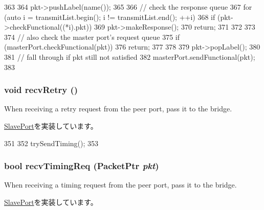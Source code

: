 \begin{DoxyCode}
363 {
364     pkt->pushLabel(name());
365 
366     // check the response queue
367     for (auto i = transmitList.begin();  i != transmitList.end(); ++i) {
368         if (pkt->checkFunctional((*i).pkt)) {
369             pkt->makeResponse();
370             return;
371         }
372     }
373 
374     // also check the master port's request queue
375     if (masterPort.checkFunctional(pkt)) {
376         return;
377     }
378 
379     pkt->popLabel();
380 
381     // fall through if pkt still not satisfied
382     masterPort.sendFunctional(pkt);
383 }
\end{DoxyCode}
\hypertarget{classBridge_1_1BridgeSlavePort_a29cb5a4f98063ce6e9210eacbdb35298}{
\subsubsection[{recvRetry}]{\setlength{\rightskip}{0pt plus 5cm}void recvRetry ()}}
\label{classBridge_1_1BridgeSlavePort_a29cb5a4f98063ce6e9210eacbdb35298}
When receiving a retry request from the peer port, pass it to the bridge. 

\hyperlink{classSlavePort_ac1ccc3bcf7ebabb20b57fab99b2be5b0}{SlavePort}を実装しています。


\begin{DoxyCode}
351 {
352     trySendTiming();
353 }
\end{DoxyCode}
\hypertarget{classBridge_1_1BridgeSlavePort_a3344d9dd0f83257feab5424e761f31c6}{
\subsubsection[{recvTimingReq}]{\setlength{\rightskip}{0pt plus 5cm}bool recvTimingReq ({\bf PacketPtr} {\em pkt})}}
\label{classBridge_1_1BridgeSlavePort_a3344d9dd0f83257feab5424e761f31c6}
When receiving a timing request from the peer port, pass it to the bridge. 

\hyperlink{classSlavePort_abcece77e42f88ee41af8d3d01bb48253}{SlavePort}を実装しています。


